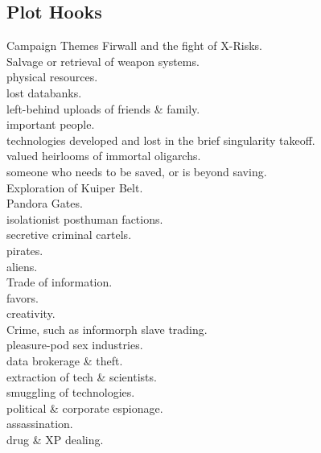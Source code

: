 
\begin{multicols}{2}

\section*{Plot Hooks}

\end{multicols}


\begin{tableone}{Campaign Themes}
Firwall and the fight of X-Risks.\\
Salvage or retrieval of weapon systems.\\
\textellipsis physical resources.\\
\textellipsis lost databanks.\\
\textellipsis left-behind uploads of friends \& family.\\
\textellipsis important people.\\
\textellipsis technologies developed and lost in the brief singularity takeoff.\\
\textellipsis valued heirlooms of immortal oligarchs.\\
\textellipsis someone who needs to be saved, or is beyond saving.\\
Exploration of Kuiper Belt.\\
\textellipsis Pandora Gates.\\
\textellipsis isolationist posthuman factions.\\
\textellipsis secretive criminal cartels.\\
\textellipsis pirates.\\
\textellipsis aliens.\\
Trade of information.\\
\textellipsis favors.\\
\textellipsis creativity.\\
Crime, such as informorph slave trading.\\
\textellipsis pleasure-pod sex industries.\\
\textellipsis data brokerage \& theft.\\
\textellipsis extraction of tech \& scientists.\\
\textellipsis smuggling of technologies.\\
\textellipsis political \& corporate espionage.\\
\textellipsis assassination.\\
\textellipsis drug \& XP dealing.\\

\end{tableone}
